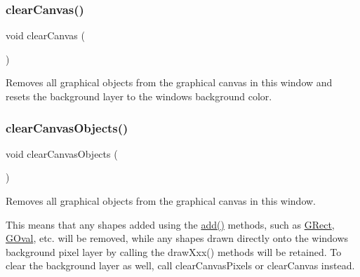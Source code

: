 \mbox{\label{classsgl_1_1GWindow_a8c64b6dc10f111538780ddca425a1693}} 
\subsubsection{\texorpdfstring{clear\+Canvas()}{clearCanvas()}}
{\footnotesize\ttfamily void clear\+Canvas (\begin{DoxyParamCaption}{ }\end{DoxyParamCaption})\hspace{0.3cm}{\ttfamily [virtual]}}



Removes all graphical objects from the graphical canvas in this window and resets the background layer to the window\textquotesingle{}s background color. 

\mbox{\label{classsgl_1_1GWindow_a7d6e3e87568ed9962d29a0c9337c4b87}} 
\subsubsection{\texorpdfstring{clear\+Canvas\+Objects()}{clearCanvasObjects()}}
{\footnotesize\ttfamily void clear\+Canvas\+Objects (\begin{DoxyParamCaption}{ }\end{DoxyParamCaption})\hspace{0.3cm}{\ttfamily [virtual]}}



Removes all graphical objects from the graphical canvas in this window. 

This means that any shapes added using the \mbox{\hyperlink{classsgl_1_1GWindow_a6f99b7c841256dbdc5acaafbbca4e685}{add()}} methods, such as \mbox{\hyperlink{classsgl_1_1GRect}{G\+Rect}}, \mbox{\hyperlink{classsgl_1_1GOval}{G\+Oval}}, etc. will be removed, while any shapes drawn directly onto the window\textquotesingle{}s background pixel layer by calling the draw\+Xxx() methods will be retained. To clear the background layer as well, call clear\+Canvas\+Pixels or clear\+Canvas instead. \mbox{\label{classsgl_1_1GWindow_a0c30950304fa997055183be1d212a262}} 
